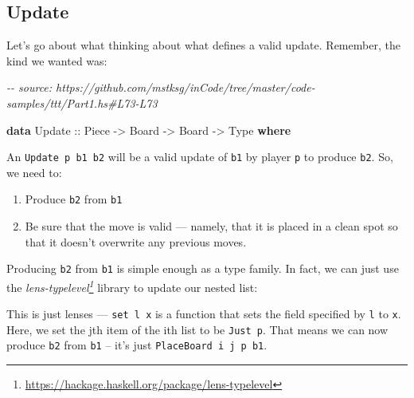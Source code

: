 \documentclass[]{article}
\newenvironment{Shaded}{}{}
\newcommand{\CommentTok}[1]{\textcolor[rgb]{0.38,0.63,0.69}{\textit{#1}}}
\newcommand{\DataTypeTok}[1]{\textcolor[rgb]{0.56,0.13,0.00}{#1}}
\newcommand{\KeywordTok}[1]{\textcolor[rgb]{0.00,0.44,0.13}{\textbf{#1}}}
\newcommand{\NormalTok}[1]{#1}
\newcommand{\OperatorTok}[1]{\textcolor[rgb]{0.40,0.40,0.40}{#1}}
\newcommand{\OtherTok}[1]{\textcolor[rgb]{0.00,0.44,0.13}{#1}}
\renewcommand{\href}[2]{#2\footnote{\url{#1}}}
\begin{document}
\subsection{Update}\label{update}

Let's go about what thinking about what defines a valid update. Remember, the
kind we wanted was:

\begin{Shaded}
\begin{Highlighting}[]
\CommentTok{{-}{-} source: https://github.com/mstksg/inCode/tree/master/code{-}samples/ttt/Part1.hs\#L73{-}L73}

\KeywordTok{data} \DataTypeTok{Update}\OtherTok{ ::} \DataTypeTok{Piece} \OtherTok{{-}\textgreater{}} \DataTypeTok{Board} \OtherTok{{-}\textgreater{}} \DataTypeTok{Board} \OtherTok{{-}\textgreater{}} \DataTypeTok{Type} \KeywordTok{where}
\end{Highlighting}
\end{Shaded}

An \texttt{Update\ p\ b1\ b2} will be a valid update of \texttt{b1} by player
\texttt{p} to produce \texttt{b2}. So, we need to:

\begin{enumerate}
\def\labelenumi{\arabic{enumi}.}
\tightlist
\item
  Produce \texttt{b2} from \texttt{b1}
\item
  Be sure that the move is valid --- namely, that it is placed in a clean spot
  so that it doesn't overwrite any previous moves.
\end{enumerate}

Producing \texttt{b2} from \texttt{b1} is simple enough as a type family. In
fact, we can just use the
\emph{\href{https://hackage.haskell.org/package/lens-typelevel}{lens-typelevel}}
library to update our nested list:

\begin{Shaded}
\end{Shaded}

This is just lenses --- \texttt{set\ l\ x} is a function that sets the field
specified by \texttt{l} to \texttt{x}. Here, we set the jth item of the ith list
to be \texttt{Just\ p}. That means we can now produce \texttt{b2} from
\texttt{b1} -- it's just \texttt{PlaceBoard\ i\ j\ p\ b1}.
\end{document}
